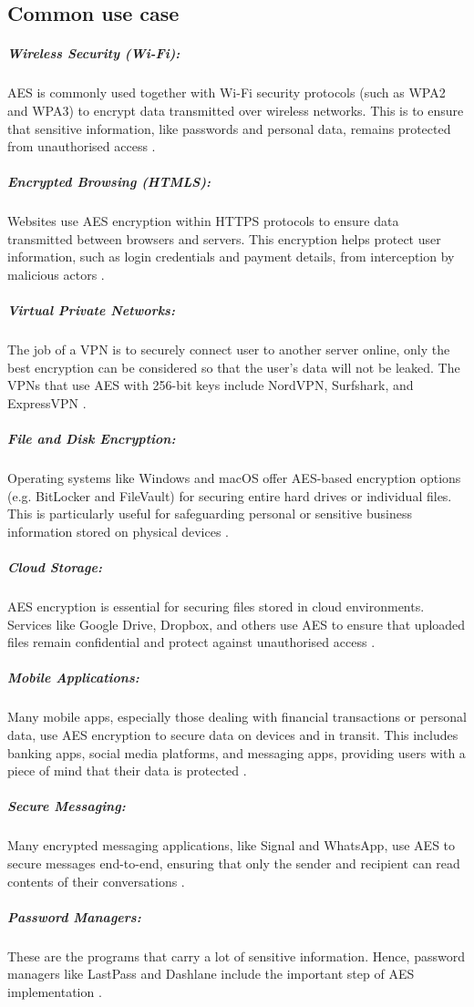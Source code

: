 \subsection{Common use case} 

\subparagraph{Wireless Security (Wi-Fi):} 
AES is commonly used together with Wi-Fi security protocols (such as WPA2 and WPA3) to encrypt data transmitted over wireless networks.
This is to ensure that sensitive information, like passwords and personal data, remains protected from unauthorised access \cite{cooper2025aes}.


\subparagraph{Encrypted Browsing (HTMLS):}
Websites use AES encryption within HTTPS protocols to ensure data transmitted between browsers and servers.
This encryption helps protect user information, such as login credentials and payment details, from interception by malicious actors \cite{cooper2025aes}.


\subparagraph{Virtual Private Networks:}
The job of a \gls{VPN} is to securely connect user to another server online, only the best encryption can be considered so that the user's data will not be leaked.
The \glspl{VPN} that use AES with 256-bit keys include NordVPN, Surfshark, and ExpressVPN \cite{rimkiene2022aes}.


\subparagraph{File and Disk Encryption:}
Operating systems like Windows and macOS offer AES-based encryption options (e.g. BitLocker and FileVault) for securing entire hard drives or individual files.
This is particularly useful for safeguarding personal or sensitive business information stored on physical devices \cite{cooper2025aes}.


\subparagraph{Cloud Storage:}
AES encryption is essential for securing files stored in cloud environments.
Services like Google Drive, Dropbox, and others use AES to ensure that uploaded files remain confidential and protect against unauthorised access \cite{cooper2025aes}.


\subparagraph{Mobile Applications:}
Many mobile apps, especially those dealing with financial transactions or personal data, use AES encryption to secure data on devices and in transit.
This includes banking apps, social media platforms, and messaging apps, providing users with a piece of mind that their data is protected \cite{cooper2025aes}.


\subparagraph{Secure Messaging:}
Many encrypted messaging applications, like Signal and WhatsApp, use AES to secure messages end-to-end, ensuring that only the sender and recipient can read contents of their conversations \cite{cooper2025aes}.


\subparagraph{Password Managers:}
These are the programs that carry a lot of sensitive information.
Hence, password managers like LastPass and Dashlane include the important step of AES implementation \cite{rimkiene2022aes}.